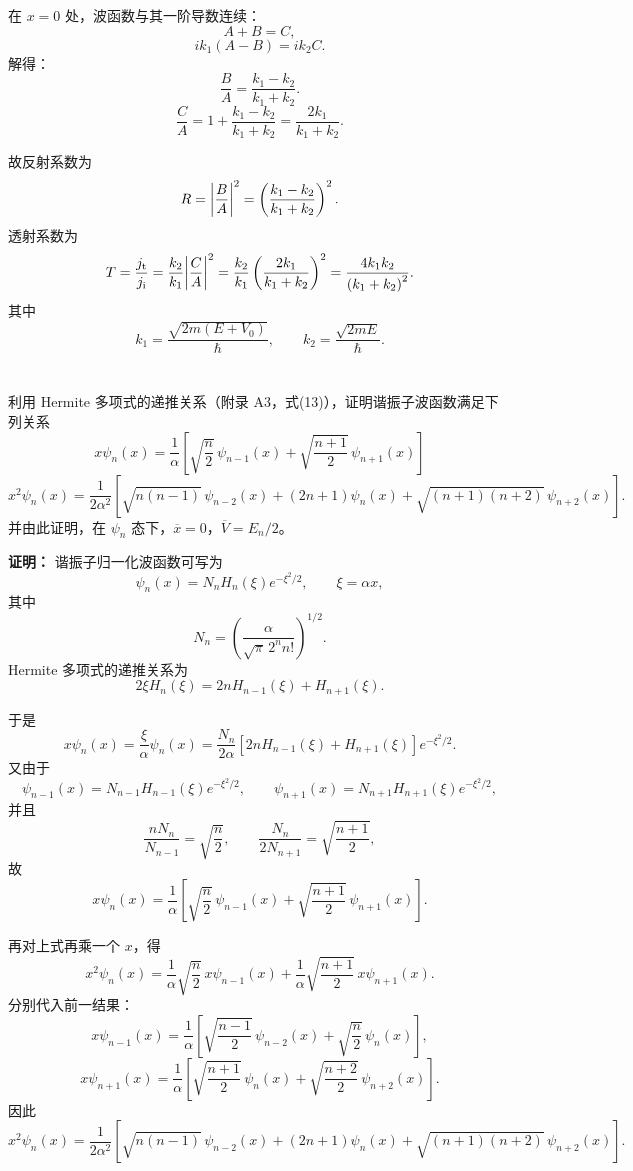 \documentclass[10pt,a4paper]{article}
\begin{document}
在 \(x=0\) 处，波函数与其一阶导数连续：
\[
A+B=C,
\]
\[
ik_1\left(A-B\right)=ik_2C.
\]
解得：
\[
\frac{B}{A}=\frac{k_1-k_2}{k_1+k_2}.
\]
\[
\frac{C}{A}
=
1+\frac{k_1-k_2}{k_1+k_2}
=
\frac{2k_1}{k_1+k_2}.
\]

故反射系数为
\[
R=\abs{\frac{B}{A}}^2
=
\left(\frac{k_1-k_2}{k_1+k_2}\right)^2.
\]
透射系数为
\[
T=\frac{j_{\mathrm{t}}}{j_{\mathrm{i}}}
=\frac{k_2}{k_1}\abs{\frac{C}{A}}^2
=\frac{k_2}{k_1}\left(\frac{2k_1}{k_1+k_2}\right)^2
=\frac{4k_1k_2}{\left(k_1+k_2\right)^2}.
\]
其中
\[
k_1=\frac{\sqrt{2m\left(E+V_0\right)}}{\hbar},
\qquad
k_2=\frac{\sqrt{2mE}}{\hbar}.
\]

\section{}
利用 Hermite 多项式的递推关系（附录 A3，式(13)），证明谐振子波函数满足下列关系
\[
x\psi_n(x)=\frac{1}{\alpha}\left[\sqrt{\frac{n}{2}}\,\psi_{n-1}(x)+\sqrt{\frac{n+1}{2}}\,\psi_{n+1}(x)\right]
\]
\[
x^2\psi_n(x)=\frac{1}{2\alpha^2}\left[\sqrt{n(n-1)}\,\psi_{n-2}(x)+(2n+1)\psi_n(x)+\sqrt{(n+1)(n+2)}\,\psi_{n+2}(x)\right].
\]
并由此证明，在 $\psi_n$ 态下，$\overline{x}=0$，$\overline{V}=E_n/2$。

\vspace{0.5cm}

\noindent\textbf{证明：}
谐振子归一化波函数可写为
\[
\psi_n(x)=N_n H_n(\xi)e^{-\xi^2/2},
\qquad
\xi=\alpha x,
\]
其中
\[
N_n=\left(\frac{\alpha}{\sqrt{\pi}\,2^n n!}\right)^{1/2}.
\]
Hermite 多项式的递推关系为
\[
2\xi H_n(\xi)=2nH_{n-1}(\xi)+H_{n+1}(\xi).
\]

于是
\[
x\psi_n(x)=\frac{\xi}{\alpha}\psi_n(x)
=\frac{N_n}{2\alpha}\left[2nH_{n-1}(\xi)+H_{n+1}(\xi)\right]e^{-\xi^2/2}.
\]
又由于
\[
\psi_{n-1}(x)=N_{n-1}H_{n-1}(\xi)e^{-\xi^2/2},
\qquad
\psi_{n+1}(x)=N_{n+1}H_{n+1}(\xi)e^{-\xi^2/2},
\]
并且
\[
\frac{nN_n}{N_{n-1}}=\sqrt{\frac{n}{2}},
\qquad
\frac{N_n}{2N_{n+1}}=\sqrt{\frac{n+1}{2}},
\]
故
\[
x\psi_n(x)=\frac{1}{\alpha}\left[\sqrt{\frac{n}{2}}\,\psi_{n-1}(x)+\sqrt{\frac{n+1}{2}}\,\psi_{n+1}(x)\right].
\]

再对上式再乘一个 \(x\)，得
\[
x^2\psi_n(x)
=
\frac{1}{\alpha}\sqrt{\frac{n}{2}}\,x\psi_{n-1}(x)
+
\frac{1}{\alpha}\sqrt{\frac{n+1}{2}}\,x\psi_{n+1}(x).
\]
分别代入前一结果：
\[
x\psi_{n-1}(x)
=
\frac{1}{\alpha}\left[\sqrt{\frac{n-1}{2}}\,\psi_{n-2}(x)+\sqrt{\frac{n}{2}}\,\psi_n(x)\right],
\]
\[
x\psi_{n+1}(x)
=
\frac{1}{\alpha}\left[\sqrt{\frac{n+1}{2}}\,\psi_n(x)+\sqrt{\frac{n+2}{2}}\,\psi_{n+2}(x)\right].
\]
因此
\[
x^2\psi_n(x)=\frac{1}{2\alpha^2}\left[\sqrt{n(n-1)}\,\psi_{n-2}(x)+(2n+1)\psi_n(x)+\sqrt{(n+1)(n+2)}\,\psi_{n+2}(x)\right].
\]
\end{document}

